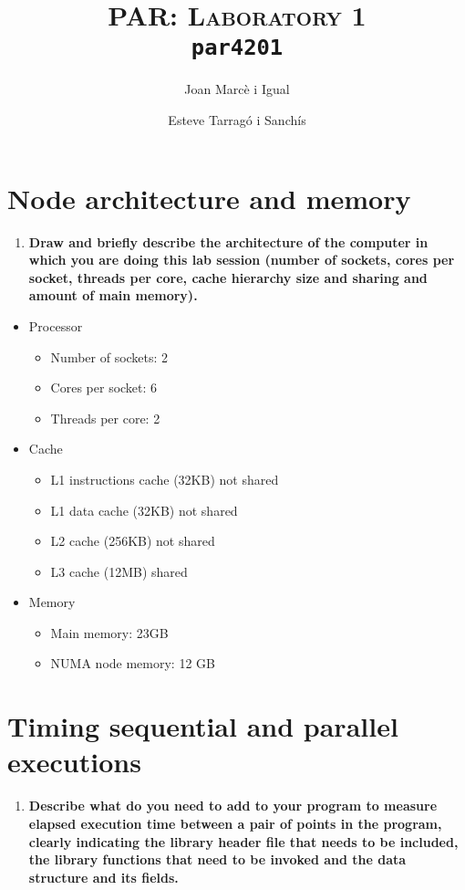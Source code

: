 \documentclass[a4paper]{article}
\title{
	\textsc{PAR: Laboratory 1} \\
	\texttt{\large par4201}
	}
\author{Joan Marcè i Igual \and Esteve Tarragó i Sanchís}
\begin{document}
\maketitle

\section*{Node architecture and memory}

\begin{enumerate}
	\item \textbf{Draw and briefly describe the architecture of the computer in which you are doing this lab session (number of sockets, cores per socket, threads per core, cache hierarchy size and sharing and amount of main memory).}
\end{enumerate}

\begin{itemize}
	\item Processor
	\begin{itemize}
		\item Number of sockets: 2
		\item Cores per socket: 6
		\item Threads per core: 2
	\end{itemize}
	
	\item Cache
	\begin{itemize}
		\item L1 instructions cache (32KB) not shared
		\item L1 data cache (32KB) not shared
		\item L2 cache (256KB) not shared
		\item L3 cache (12MB) shared
	\end{itemize}
	
	\item Memory
	\begin{itemize}
		\item Main memory: 23GB
		\item NUMA node memory: 12 GB
	\end{itemize}
\end{itemize}

\section*{Timing sequential and parallel executions}

\begin{enumerate}[resume]
	\item \textbf{Describe what do you need to add to your program to measure elapsed execution time between a pair of points in the program, clearly indicating the library header file that needs to be included, the library functions that need to be invoked and the data structure and its fields.}
\end{enumerate}
\end{document}
